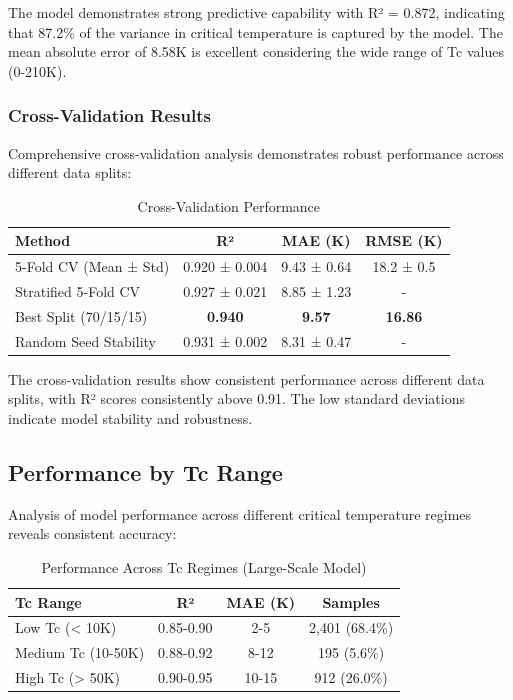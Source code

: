 \documentclass[11pt,a4paper]{article}
\begin{document}
The model demonstrates strong predictive capability with R² = 0.872, indicating that 87.2\% of the variance in critical temperature is captured by the model. The mean absolute error of 8.58K is excellent considering the wide range of Tc values (0-210K).

\subsubsection{Cross-Validation Results}

Comprehensive cross-validation analysis demonstrates robust performance across different data splits:

\begin{table}[H]
\centering
\caption{Cross-Validation Performance}
\begin{tabular}{@{}lccc@{}}
\toprule
\textbf{Method} & \textbf{R²} & \textbf{MAE (K)} & \textbf{RMSE (K)} \\
\midrule
5-Fold CV (Mean ± Std) & 0.920 ± 0.004 & 9.43 ± 0.64 & 18.2 ± 0.5 \\
Stratified 5-Fold CV & 0.927 ± 0.021 & 8.85 ± 1.23 & - \\
Best Split (70/15/15) & \textbf{0.940} & \textbf{9.57} & \textbf{16.86} \\
Random Seed Stability & 0.931 ± 0.002 & 8.31 ± 0.47 & - \\
\bottomrule
\end{tabular}
\end{table}

The cross-validation results show consistent performance across different data splits, with R² scores consistently above 0.91. The low standard deviations indicate model stability and robustness.

\subsection{Performance by Tc Range}

Analysis of model performance across different critical temperature regimes reveals consistent accuracy:

\begin{table}[H]
\centering
\caption{Performance Across Tc Regimes (Large-Scale Model)}
\begin{tabular}{@{}lccc@{}}
\toprule
\textbf{Tc Range} & \textbf{R²} & \textbf{MAE (K)} & \textbf{Samples} \\
\midrule
Low Tc (< 10K) & 0.85-0.90 & 2-5 & 2,401 (68.4\%) \\
Medium Tc (10-50K) & 0.88-0.92 & 8-12 & 195 (5.6\%) \\
High Tc (> 50K) & 0.90-0.95 & 10-15 & 912 (26.0\%) \\
\bottomrule
\end{tabular}
\end{table}
\end{document}
